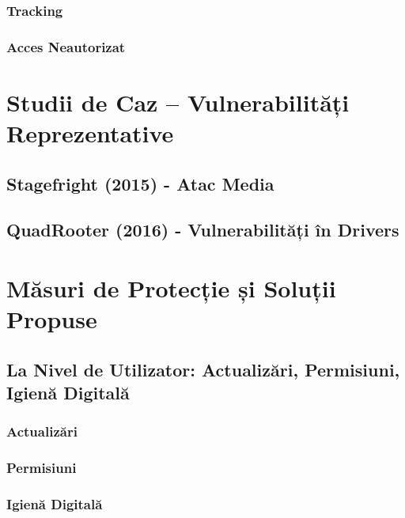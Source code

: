 \documentclass[11pt,a4paper,twocolumn]{article}
\theoremstyle{definition}
\theoremstyle{plain}
\theoremstyle{remark}
\begin{document}
\subsubsection{Tracking}

\subsubsection{Acces Neautorizat}

\section{Studii de Caz – Vulnerabilități Reprezentative}

\subsection{Stagefright (2015) - Atac Media}

\subsection{QuadRooter (2016) - Vulnerabilități în Drivers}

\section{Măsuri de Protecție și Soluții Propuse}

\subsection{La Nivel de Utilizator: Actualizări, Permisiuni, Igienă Digitală}

\subsubsection{Actualizări}

\subsubsection{Permisiuni}

\subsubsection{Igienă Digitală}
\end{document}

